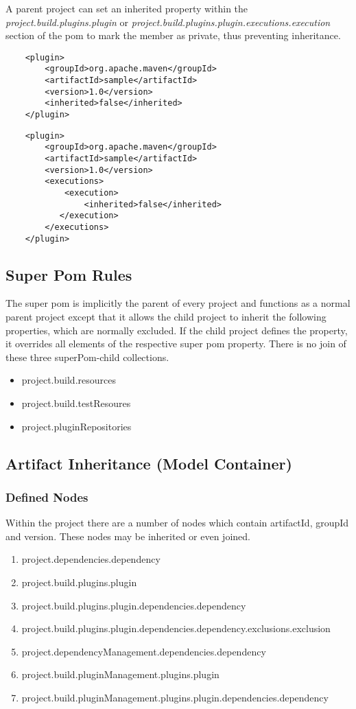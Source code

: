 \documentclass[12pt]{amsart}
\begin{document}
A parent project can set an inherited property within the \emph{project.build.plugins.plugin} or \emph{project.build.plugins.plugin.executions.execution} section of the pom to mark the member as private, thus preventing inheritance.

\begin{verbatim}
    <plugin>
        <groupId>org.apache.maven</groupId>
        <artifactId>sample</artifactId>
        <version>1.0</version>
        <inherited>false</inherited>
    </plugin>
\end{verbatim}

\begin{verbatim}
    <plugin>
        <groupId>org.apache.maven</groupId>
        <artifactId>sample</artifactId>
        <version>1.0</version>
        <executions>
            <execution>
                <inherited>false</inherited>
           </execution>
        </executions>
    </plugin>
\end{verbatim}

\subsection{Super Pom Rules}
The super pom is implicitly  the parent of every project and functions as a normal parent project except that it allows the child project to inherit the following properties, which are normally excluded. If the child project defines the property,  it overrides all elements of the respective super pom property. There is no join of these three superPom-child collections.
\begin{itemize}
\item project.build.resources
\item project.build.testResoures
\item project.pluginRepositories 
\end{itemize}

\subsection{Artifact Inheritance (Model Container)}
\subsubsection{Defined Nodes}
Within the project there are a number of nodes which contain artifactId, groupId and version. These nodes may be inherited or even joined.
\begin{enumerate}
\item project.dependencies.dependency
\item project.build.plugins.plugin
\item project.build.plugins.plugin.dependencies.dependency
\item project.build.plugins.plugin.dependencies.dependency.exclusions.exclusion
\item project.dependencyManagement.dependencies.dependency
\item project.build.pluginManagement.plugins.plugin
\item project.build.pluginManagement.plugins.plugin.dependencies.dependency
\end{enumerate}
\end{document}

